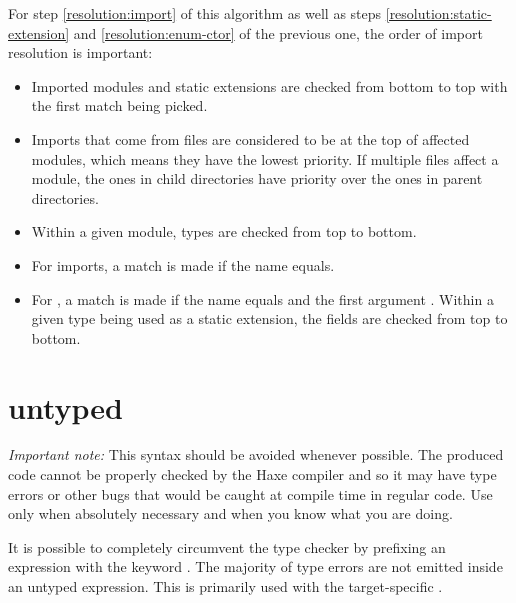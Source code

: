 For step \ref{resolution:import} of this algorithm as well as steps \ref{resolution:static-extension} and \ref{resolution:enum-ctor} of the previous one, the order of import resolution is important:

\begin{itemize}
	\item Imported modules and static extensions are checked from bottom to top with the first match being picked.
	\item Imports that come from  files are considered to be at the top of affected modules, which means they have the lowest priority. If multiple  files affect a module, the ones in child directories have priority over the ones in parent directories.
	\item Within a given module, types are checked from top to bottom.
	\item For imports, a match is made if the name equals.
	\item For , a match is made if the name equals and the first argument . Within a given type being used as a static extension, the fields are checked from top to bottom.
\end{itemize}


\section{untyped}
\label{type-system-untyped}

\emph{Important note:} This syntax should be avoided whenever possible. The produced code cannot be properly checked by the Haxe compiler and so it may have type errors or other bugs that would be caught at compile time in regular code. Use only when absolutely necessary and when you know what you are doing.

It is possible to completely circumvent the type checker by prefixing an expression with the keyword . The majority of type errors are not emitted inside an untyped expression. This is primarily used with the target-specific .
